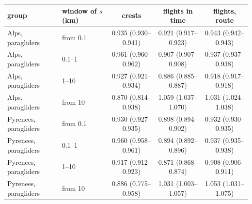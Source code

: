 \begin{tabular}{llccc}
\toprule
group & window of $s$ (km) & crests & flights in time & flights, route \\
\midrule
Alps, paragliders & from 0.1 & 0.935 (0.930--0.941) & 0.921 (0.917--0.923) & 0.943 (0.942--0.943) \\
Alps, paragliders & 0.1--1 & 0.961 (0.960--0.962) & 0.907 (0.907--0.908) & 0.937 (0.937--0.938) \\
Alps, paragliders & 1--10 & 0.927 (0.921--0.934) & 0.886 (0.885--0.887) & 0.918 (0.917--0.918) \\
Alps, paragliders & from 10 & 0.870 (0.814--0.938) & 1.059 (1.037--1.070) & 1.031 (1.024--1.038) \\
Pyrenees, paragliders & from 0.1 & 0.930 (0.927--0.935) & 0.898 (0.894--0.902) & 0.932 (0.930--0.935) \\
Pyrenees, paragliders & 0.1--1 & 0.960 (0.958--0.961) & 0.894 (0.892--0.896) & 0.937 (0.935--0.938) \\
Pyrenees, paragliders & 1--10 & 0.917 (0.912--0.923) & 0.871 (0.868--0.874) & 0.908 (0.906--0.911) \\
Pyrenees, paragliders & from 10 & 0.886 (0.775--0.958) & 1.031 (1.003--1.057) & 1.053 (1.031--1.075) \\
\bottomrule
\end{tabular}
